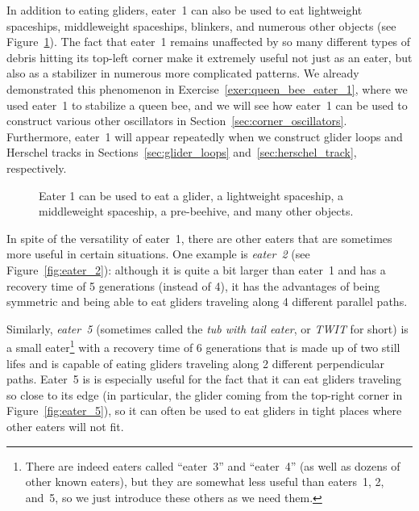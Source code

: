 In addition to eating gliders, eater~1 can also be used to eat lightweight spaceships, middleweight spaceships, blinkers, and numerous other objects (see Figure~\ref{fig:eater_1_multi}). The fact that eater~1 remains unaffected by so many different types of debris hitting its top-left corner make it extremely useful not just as an eater, but also as a stabilizer in numerous more complicated patterns. We already demonstrated this phenomenon in Exercise~\ref{exer:queen_bee_eater_1}, where we used eater~1 to stabilize a queen bee, and we will see how eater~1 can be used to construct various other oscillators in Section~\ref{sec:corner_oscillators}. Furthermore, eater~1 will appear repeatedly when we construct glider loops and Herschel tracks in Sections~\ref{sec:glider_loops} and~\ref{sec:herschel_track}, respectively.

\begin{figure}[!htb]
	\centering{}
	\caption{Eater 1 can be used to eat a glider, a lightweight spaceship, a middleweight spaceship, a pre-beehive, and many other objects.}\label{fig:eater_1_multi}
\end{figure}

In spite of the versatility of eater~1, there are other eaters that are sometimes more useful in certain situations. One example is \emph{eater~2} (see Figure~\ref{fig:eater_2}): although it is quite a bit larger than eater~1 and has a recovery time of 5 generations (instead of 4), it has the advantages of being symmetric and being able to eat gliders traveling along 4 different parallel paths.

Similarly, \emph{eater~5} (sometimes called the \emph{tub with tail eater}, or \emph{TWIT} for short) is a small eater\footnote{There are indeed eaters called ``eater~3'' and ``eater~4'' (as well as dozens of other known eaters), but they are somewhat less useful than eaters~1, 2, and~5, so we just introduce these others as we need them.} with a recovery time of 6 generations that is made up of two still lifes and is capable of eating gliders traveling along 2 different perpendicular paths. Eater~5 is is especially useful for the fact that it can eat gliders traveling so close to its edge (in particular, the glider coming from the top-right corner in Figure~\ref{fig:eater_5}), so it can often be used to eat gliders in tight places where other eaters will not fit.

